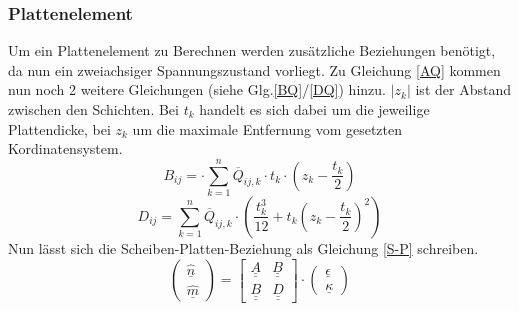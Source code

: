 \subsubsection{Plattenelement}
Um ein Plattenelement zu Berechnen werden zusätzliche Beziehungen benötigt, da nun ein zweiachsiger Spannungszustand vorliegt. Zu Gleichung \ref{AQ} kommen nun noch 2 weitere Gleichungen (siehe Glg.\ref{BQ}/\ref{DQ}) hinzu. $|z_{k}|$ ist der Abstand zwischen den Schichten. Bei $t_{k}$ handelt es sich dabei um die jeweilige Plattendicke, bei $z_{k}$ um die maximale Entfernung vom gesetzten Kordinatensystem.
\begin{equation}
\label{BQ}
	B_{ij}= \cdot \sum_{k=1}^{n} \overline{Q}_{ij,k}\cdot t_{k}\cdot \left(z_{k}-\frac{t_{k}}{2}\right)
\end{equation}
\begin{equation}
\label{DQ} 
	D_{ij}=\sum_{k=1}^{n} \overline{Q}_{ij,k}\cdot \left(\frac{t_{k}^{3}}{12}+t_{k}\left(z_{k}-\frac{t_{k}}{2}\right)^{2}\right)
\end{equation}
\noindent
Nun lässt sich die Scheiben-Platten-Beziehung als Gleichung \ref{S-P} schreiben.\cite{item3}
\begin{equation}
\label{S-P}
	\begin{pmatrix}
		\hat{\underline{n}}\\
		\hat{\underline{m}}
	\end{pmatrix}
	= \begin{bmatrix}
		\underline{\underline{A}}&\underline{\underline{B}}\\
		\underline{\underline{B}}&\underline{\underline{D}}
	\end{bmatrix}
	\cdot \begin{pmatrix}
		\underline{\epsilon}\\
		\underline{\kappa}
	\end{pmatrix}
\end{equation}\\


\newpage
